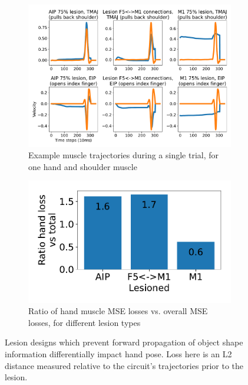 \documentclass[12pt]{iopart}
\begin{document}
\begin{figure}[h]
	\centering
	\begin{subfigure}[c]{0.62\textwidth}
	    \centering
	    \includegraphics[width=\textwidth]{lesion_trajs.pdf}
	    \caption{Example muscle trajectories during a single trial, for one hand and shoulder muscle}
	\end{subfigure}
	\hfill
	\begin{subfigure}[c]{0.32\textwidth}
	    \centering
	    \includegraphics[width=\textwidth]{lesion_hand.pdf}
	    \caption{Ratio of hand muscle MSE losses vs. overall MSE losses, for different lesion types}
	\end{subfigure}
	\hfill
	\caption{Lesion designs which prevent forward propagation of object shape information
	         differentially impact hand pose. Loss here is an L2 distance
		 measured relative to the circuit's trajectories prior to the lesion.}
	\label{fig:lesion}
\end{figure}
\end{document}
